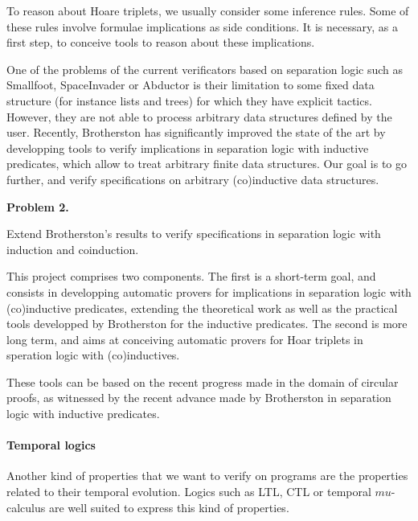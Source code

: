 \documentclass[11pt,twocolumn]{article}
\begin{document}
To reason about Hoare triplets, we usually consider some inference rules. Some of these rules 
involve formulae implications as side conditions. It is necessary, as a first step, to conceive tools to reason about these implications.

One of the problems of the current verificators based on separation logic such as Smallfoot\cite{BerdineCO05},
SpaceInvader \cite{DistefanoOY06} or Abductor \cite{CalcagnoDOY11} is their limitation to some fixed data structure (for instance lists and trees) for which they have explicit tactics. However, they are not able to process arbitrary data structures defined by the user. Recently, Brotherston has significantly improved the state of the art by developping tools to verify implications in separation logic with inductive predicates, which allow to treat 
arbitrary finite data structures. Our goal is to go further, and verify specifications on arbitrary (co)inductive data structures. 


\begin{center}
\begin{bclogo}[logo= ,arrondi = 0.1, couleur = green!10,  epBarre = 0]{}
  \vspace{-10pt}
  \textbf{Problem 2.}
  
  Extend Brotherston's results to verify specifications in separation logic with induction and coinduction.
\end{bclogo}
\end{center}

This project comprises two components. The first is a short-term goal, and consists in developping automatic provers 
for implications in separation logic with (co)inductive predicates, extending the theoretical work as well as the practical tools developped by Brotherston for the inductive predicates. The second is more long term, and aims at conceiving automatic provers for Hoar triplets in speration logic with (co)inductives. 

These tools can be based on the recent progress made in the domain of circular proofs, as witnessed  by the recent advance made by Brotherston in separation logic with inductive predicates.


\paragraph{Temporal logics}

Another kind of properties that we want to verify on programs are the properties related to their temporal evolution. Logics such as LTL, CTL or temporal $mu$-calculus are well suited to express this kind of properties. 
\end{document}

